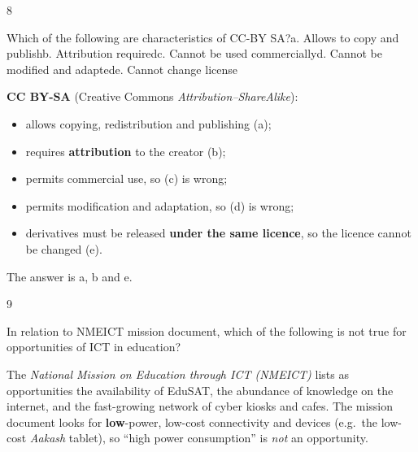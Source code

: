 \begin{question}{8}
{Which of the following are characteristics of CC-BY SA?\newline a. Allows to copy and publish\newline b. Attribution required\newline c. Cannot be used commercially\newline d. Cannot be modified and adapted\newline e. Cannot change license\par}
\begin{explain}
\textbf{CC BY-SA} (Creative Commons \emph{Attribution--ShareAlike}):
\begin{itemize}
\item allows copying, redistribution and publishing (a);
\item requires \textbf{attribution} to the creator (b);
\item permits commercial use, so (c) is wrong;
\item permits modification and adaptation, so (d) is wrong;
\item derivatives must be released \textbf{under the same licence}, so the licence cannot be changed (e).
\end{itemize}
The answer is a, b and e.
\end{explain}
\end{question}

\begin{question}{9}
{In relation to NMEICT mission document, which of the following is not true for opportunities of ICT in education?\par}
\begin{explain}
The \emph{National Mission on Education through ICT (NMEICT)} lists as opportunities the availability of EduSAT, the abundance of knowledge on the internet, and the fast-growing network of cyber kiosks and cafes. The mission document looks for \textbf{low}-power, low-cost connectivity and devices (e.g.\ the low-cost \emph{Aakash} tablet), so ``high power consumption'' is \emph{not} an opportunity.
\end{explain}
\end{question}

